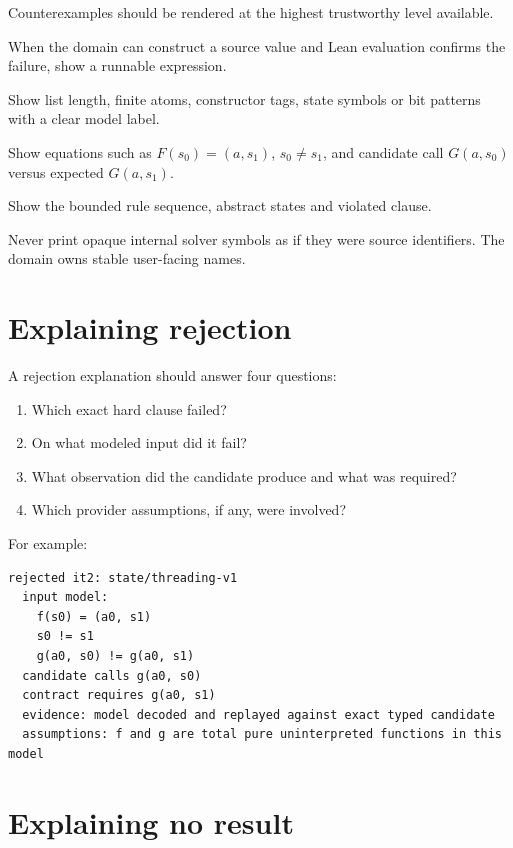 \documentclass[11pt,oneside]{report}
\begin{document}
Counterexamples should be rendered at the highest trustworthy level available.

\begin{description}[leftmargin=2.2em,style=nextline]
\item[Concrete Lean value.] When the domain can construct a source value and Lean evaluation confirms the failure, show a runnable expression.
\item[Finite abstract value.] Show list length, finite atoms, constructor tags, state symbols or bit patterns with a clear model label.
\item[Relational model.] Show equations such as $F(s_0)=(a,s_1)$, $s_0\ne s_1$, and candidate call $G(a,s_0)$ versus expected $G(a,s_1)$.
\item[CHC trace.] Show the bounded rule sequence, abstract states and violated clause.
\end{description}

Never print opaque internal solver symbols as if they were source identifiers. The domain owns stable user-facing names.

\section{Explaining rejection}

A rejection explanation should answer four questions:

\begin{enumerate}[leftmargin=2em]
\item Which exact hard clause failed?
\item On what modeled input did it fail?
\item What observation did the candidate produce and what was required?
\item Which provider assumptions, if any, were involved?
\end{enumerate}

For example:

\begin{lstlisting}[language={}]
rejected it2: state/threading-v1
  input model:
    f(s0) = (a0, s1)
    s0 != s1
    g(a0, s0) != g(a0, s1)
  candidate calls g(a0, s0)
  contract requires g(a0, s1)
  evidence: model decoded and replayed against exact typed candidate
  assumptions: f and g are total pure uninterpreted functions in this model
\end{lstlisting}

\section{Explaining no result}
\end{document}
